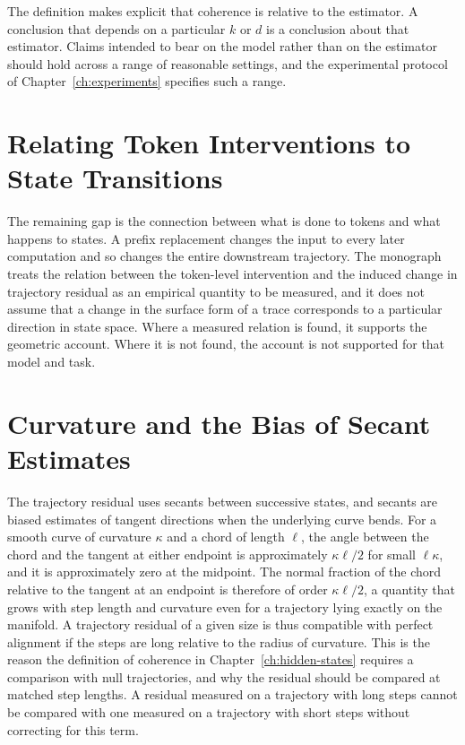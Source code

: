 The definition makes explicit that coherence is relative to the estimator. A conclusion that depends on a particular $k$ or $d$ is a conclusion about that estimator. Claims intended to bear on the model rather than on the estimator should hold across a range of reasonable settings, and the experimental protocol of Chapter~\ref{ch:experiments} specifies such a range.

\section{Relating Token Interventions to State Transitions}

The remaining gap is the connection between what is done to tokens and what happens to states. A prefix replacement changes the input to every later computation and so changes the entire downstream trajectory. The monograph treats the relation between the token-level intervention and the induced change in trajectory residual as an empirical quantity to be measured, and it does not assume that a change in the surface form of a trace corresponds to a particular direction in state space. Where a measured relation is found, it supports the geometric account. Where it is not found, the account is not supported for that model and task.

\section{Curvature and the Bias of Secant Estimates}

The trajectory residual uses secants between successive states, and secants are biased estimates of tangent directions when the underlying curve bends. For a smooth curve of curvature $\kappa$ and a chord of length $\ell$, the angle between the chord and the tangent at either endpoint is approximately $\kappa\ell/2$ for small $\ell\kappa$, and it is approximately zero at the midpoint. The normal fraction of the chord relative to the tangent at an endpoint is therefore of order $\kappa\ell/2$, a quantity that grows with step length and curvature even for a trajectory lying exactly on the manifold. A trajectory residual of a given size is thus compatible with perfect alignment if the steps are long relative to the radius of curvature. This is the reason the definition of coherence in Chapter~\ref{ch:hidden-states} requires a comparison with null trajectories, and why the residual should be compared at matched step lengths. A residual measured on a trajectory with long steps cannot be compared with one measured on a trajectory with short steps without correcting for this term.

